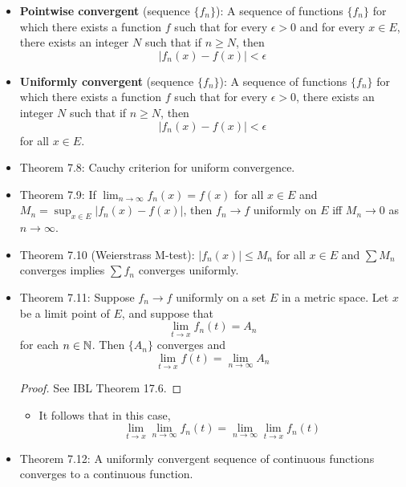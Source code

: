 \documentclass[../../notes.tex]{subfiles}
\begin{document}
\begin{itemize}
    \item \textbf{Pointwise convergent} (sequence $\{f_n\}$): A sequence of functions $\{f_n\}$ for which there exists a function $f$ such that for every $\epsilon>0$ and for every $x\in E$, there exists an integer $N$ such that if $n\geq N$, then
    \begin{equation*}
        |f_n(x)-f(x)| < \epsilon
    \end{equation*}
    \item \textbf{Uniformly convergent} (sequence $\{f_n\}$): A sequence of functions $\{f_n\}$ for which there exists a function $f$ such that for every $\epsilon>0$, there exists an integer $N$ such that if $n\geq N$, then
    \begin{equation*}
        |f_n(x)-f(x)| < \epsilon
    \end{equation*}
    for all $x\in E$.
    \item Theorem 7.8: Cauchy criterion for uniform convergence.
    \item Theorem 7.9: If $\lim_{n\to\infty}f_n(x)=f(x)$ for all $x\in E$ and $M_n=\sup_{x\in E}|f_n(x)-f(x)|$, then $f_n\to f$ uniformly on $E$ iff $M_n\to 0$ as $n\to\infty$.
    \item Theorem 7.10 (Weierstrass M-test): $|f_n(x)|\leq M_n$ for all $x\in E$ and $\sum M_n$ converges implies $\sum f_n$ converges uniformly.
    \item Theorem 7.11: Suppose $f_n\to f$ uniformly on a set $E$ in a metric space. Let $x$ be a limit point of $E$, and suppose that
    \begin{equation*}
        \lim_{t\to x}f_n(t) = A_n
    \end{equation*}
    for each $n\in\mathbb{N}$. Then $\{A_n\}$ converges and
    \begin{equation*}
        \lim_{t\to x}f(t) = \lim_{n\to\infty}A_n
    \end{equation*}
    \begin{proof}
        See IBL Theorem 17.6.
    \end{proof}
    \begin{itemize}
        \item It follows that in this case,
        \begin{equation*}
            \lim_{t\to x}\lim_{n\to\infty}f_n(t) = \lim_{n\to\infty}\lim_{t\to x}f_n(t)
        \end{equation*}
    \end{itemize}
    \item Theorem 7.12: A uniformly convergent sequence of continuous functions converges to a continuous function.

\end{itemize}
\end{document}
